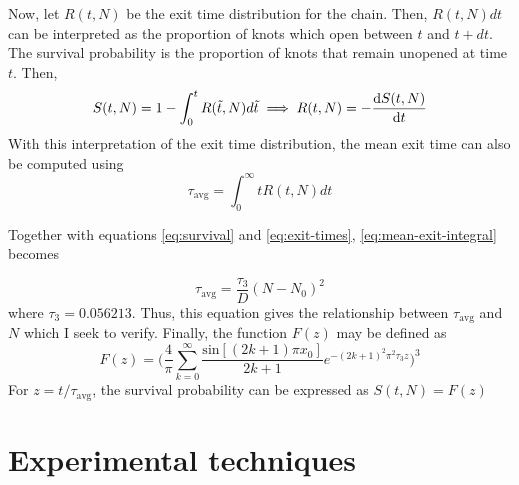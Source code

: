 \documentclass[11pt]{article}
\begin{document}
Now, let $R(t, N)$ be the exit time distribution for the chain. Then, $R(t, N)dt$ can be
interpreted as the proportion of knots which open between $t$ and $t+dt$. The 
survival probability is the proportion of knots that remain unopened at time $t$. Then, 
    \begin{equation}
        \label{eq:exit-times}
        S(t, N) = 1 - \int_{0}^{t}R(\tilde{t}, N) d\tilde{t} \implies R(t, N) = -\derivative{S(t, N)}{t}
    \end{equation}
With this interpretation of the exit time distribution, the mean exit time can also be computed
using
\begin{equation}
    \label{eq:mean-exit-integral}
    \tau_{\text{avg}} = \int_{0}^{\infty} t R(t, N) dt
\end{equation}

Together with equations \ref{eq:survival} and \ref{eq:exit-times}, \ref{eq:mean-exit-integral} becomes

\begin{equation}
    \label{eq:mean-exit}
    \tau_{\text{avg}} = \frac{\tau_3}{D}(N-N_0)^2
\end{equation}
where $\tau_3 = 0.056213$. Thus, this equation gives the relationship between 
$\tau_{\text{avg}}$ and $N$ which I seek to verify. Finally, the function $F(z)$ may be defined as 
\begin{equation}
    \label{eq:characteristic}
    F(z) = \Bigg( \frac{4}{\pi} \sum_{k=0}^{\infty} 
    \frac{\text{sin}[(2k+1)\pi x_0]}{2k+1} e^{-(2k+1)^2\pi^2\tau_3 z} \Bigg)^3
\end{equation}
For $z=t/\tau_{\text{avg}}$, the survival probability can be expressed as $S(t, N) = F(z)$

\section{Experimental techniques}
\end{document}
